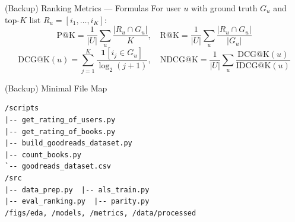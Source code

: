 \documentclass[aspectratio=169,11pt]{beamer}
\begin{document}
\begin{frame}{(Backup) Ranking Metrics --- Formulas}
\footnotesize
For user \(u\) with ground truth \(G_u\) and top-\(K\) list \(R_u=[i_1,\dots,i_K]\):
\[
\mathrm{P@K}=\frac{1}{|U|}\sum_{u}\frac{|R_u\cap G_u|}{K},\quad
\mathrm{R@K}=\frac{1}{|U|}\sum_{u}\frac{|R_u\cap G_u|}{|G_u|}
\]
\[
\mathrm{DCG@K}(u)=\sum_{j=1}^{K}\frac{\mathbf{1}[i_j\in G_u]}{\log_2(j+1)},\quad
\mathrm{NDCG@K}=\frac{1}{|U|}\sum_{u}\frac{\mathrm{DCG@K}(u)}{\mathrm{IDCG@K}(u)}
\]
\end{frame}

\begin{frame}[fragile]{(Backup) Minimal File Map}
\scriptsize
\begin{verbatim}
/scripts
|-- get_rating_of_users.py
|-- get_rating_of_books.py
|-- build_goodreads_dataset.py
|-- count_books.py
`-- goodreads_dataset.csv
/src
|-- data_prep.py  |-- als_train.py
|-- eval_ranking.py  |-- parity.py
/figs/eda, /models, /metrics, /data/processed
\end{verbatim}
\end{frame}
\end{document}
